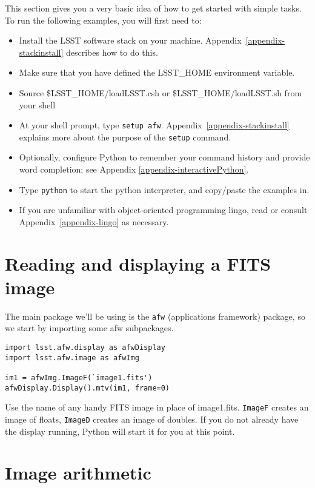 This section gives you a very basic idea of how to get started with
simple tasks.  To run the following examples, you will first need to:
\begin{itemize}
\item Install the LSST software stack on your machine.
Appendix~\ref{appendix-stackinstall} describes how to do this.
\item Make sure that you have defined the LSST\_HOME environment
variable.
\item Source \$LSST\_HOME/loadLSST.csh or \$LSST\_HOME/loadLSST.sh
from your shell
\item At your shell prompt, type \texttt{setup
afw}. Appendix~\ref{appendix-stackinstall} explains more about the
purpose of the \texttt{setup} command.
\item Optionally, configure Python to remember
your command history and provide word completion; see
Appendix \ref{appendix-interactivePython}.
\item Type \texttt{python} to start the python interpreter, and copy/paste the examples in.
\item If you are unfamiliar with object-oriented programming lingo,
read or consult Appendix~\ref{appendix-lingo} as necessary.
\end{itemize}

\section{Reading and displaying a FITS image}

The main package we'll be using is the \texttt{afw} (applications
framework) package, so we start by importing some afw subpackages.

\begin{verbatim}
import lsst.afw.display as afwDisplay
import lsst.afw.image as afwImg

im1 = afwImg.ImageF(`image1.fits')
afwDisplay.Display().mtv(im1, frame=0)
\end{verbatim}

Use the name of any handy FITS image in place of image1.fits.
\texttt{ImageF} creates an image of floats, \texttt{ImageD} creates an
image of doubles.  If you do not already have the display running, Python
will start it for you at this point.

\section{Image arithmetic}

